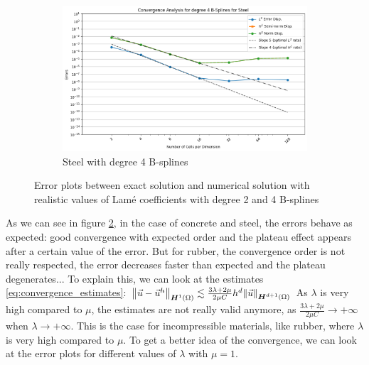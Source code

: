 \documentclass[a4paper,12pt,twoside]{report}
\begin{document}
\begin{figure}[!h]
\begin{subfigure}[b]{0.49\textwidth}
		\includegraphics[width=\textwidth]{figures/figures_non_mixed_realistic/convergence_plot_degree_4_lambda=120000000000.0.png}
		\caption{Steel with degree 4 B-splines}
		\label{fig:steel_degree_4}
	\end{subfigure}
	\caption{Error plots between exact solution and numerical solution with realistic values of Lamé coefficients with degree 2 and 4 B-splines}
	\label{fig:error_realistic_lame}
\end{figure}

As we can see in figure \ref{fig:error_realistic_lame}, in the case of concrete and steel, the errors behave as expected: good convergence with expected order and the plateau effect appears after a certain value of the error. 
But for rubber, the convergence order is not really respected, the error decreases faster than expected and the plateau degenerates... 
To explain this, we can look at the estimates \eqref{eq:convergence_estimates}:
$\norm{\vec u - \vec u^h}_{\boldsymbol H^1(\Omega)} \lesssim \frac{3\lambda + 2\mu}{2\mu C} h^d \norm{\vec u}_{\boldsymbol H^{d+1}(\Omega)}$
As $\lambda$ is very high compared to $\mu$, the estimates are not really valid anymore, as $\frac{3\lambda + 2\mu}{2\mu C} \rightarrow + \infty$ when $\lambda \rightarrow + \infty$. 
This is the case for incompressible materials, like rubber, where $\lambda$ is very high compared to $\mu$. To get a better idea of the convergence, we can look at the error plots for different values of $\lambda$ with $\mu = 1$.
\end{document}
